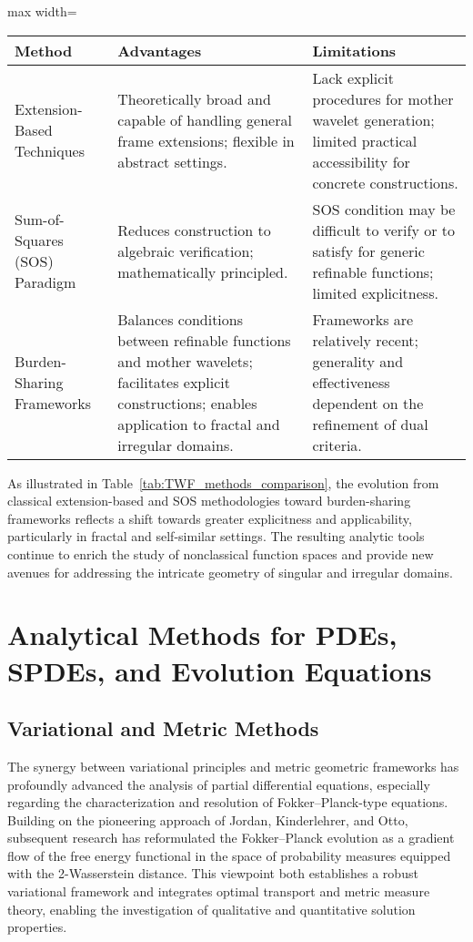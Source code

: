 \documentclass[sigconf]{acmart}
\begin{document}
\begin{table*}[htbp]
\centering
\caption{Comparison of Construction Methods for Tight Wavelet Frames (TWFs)}
\label{tab:TWF_methods_comparison}
\begin{adjustbox}{max width=\textwidth}
\begin{tabular}{lll}
\toprule
\textbf{Method} & \textbf{Advantages} & \textbf{Limitations} \\
\midrule
Extension-Based Techniques & Theoretically broad and capable of handling general frame extensions; flexible in abstract settings. & Lack explicit procedures for mother wavelet generation; limited practical accessibility for concrete constructions. \\
Sum-of-Squares (SOS) Paradigm & Reduces construction to algebraic verification; mathematically principled. & SOS condition may be difficult to verify or to satisfy for generic refinable functions; limited explicitness. \\
Burden-Sharing Frameworks & Balances conditions between refinable functions and mother wavelets; facilitates explicit constructions; enables application to fractal and irregular domains. & Frameworks are relatively recent; generality and effectiveness dependent on the refinement of dual criteria. \\
\bottomrule
\end{tabular}
\end{adjustbox}
\end{table*}

As illustrated in Table~\ref{tab:TWF_methods_comparison}, the evolution from classical extension-based and SOS methodologies toward burden-sharing frameworks reflects a shift towards greater explicitness and applicability, particularly in fractal and self-similar settings. The resulting analytic tools continue to enrich the study of nonclassical function spaces and provide new avenues for addressing the intricate geometry of singular and irregular domains.

\section{Analytical Methods for PDEs, SPDEs, and Evolution Equations}

\subsection{Variational and Metric Methods}

The synergy between variational principles and metric geometric frameworks has profoundly advanced the analysis of partial differential equations, especially regarding the characterization and resolution of Fokker–Planck-type equations. Building on the pioneering approach of Jordan, Kinderlehrer, and Otto, subsequent research has reformulated the Fokker–Planck evolution as a gradient flow of the free energy functional in the space of probability measures equipped with the 2-Wasserstein distance. This viewpoint both establishes a robust variational framework and integrates optimal transport and metric measure theory, enabling the investigation of qualitative and quantitative solution properties. 
\end{document}
